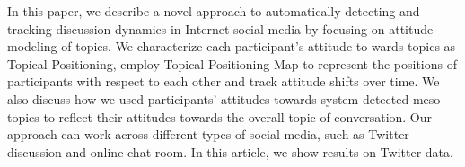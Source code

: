 In this paper, we describe a novel approach to automatically detecting and tracking discussion dynamics in Internet social media by focusing on attitude
 modeling of topics. We characterize each participant's attitude to-wards
 topics as Topical Positioning, employ Topical Positioning Map to represent the
 positions of participants with respect to each other and track attitude shifts
 over time. We also discuss how we used participants' attitudes towards
 system-detected meso-topics to reflect their attitudes towards the overall
 topic of conversation. Our approach can work across different types of social
 media, such as Twitter discussion and online chat room. In this article, we
 show results on Twitter data.

